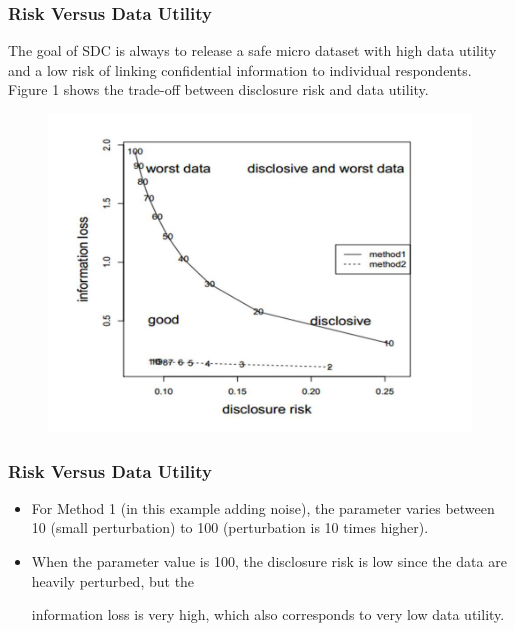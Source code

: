 \documentclass{beamer}
\begin{document}
\begin{frame}
	\frametitle{Risk Versus Data Utility}
The goal of SDC is always to release a safe micro dataset with high data utility and
a low risk of linking conﬁdential information to individual respondents. Figure 1
shows the trade-off between disclosure risk and data utility. 

\end{frame}

\begin{frame}
\begin{figure}
\centering
\includegraphics[width=0.99\linewidth]{JPEGS/TemplGraph1}
\end{figure}

\end{frame}
\begin{frame}
		\frametitle{Risk Versus Data Utility}
\begin{itemize}
\item For Method 1 (in this example adding noise), the parameter varies between 10
(small perturbation) to 100 (perturbation is 10 times higher). 
\item When the parameter
value is 100, the disclosure risk is low since the data are heavily perturbed, but the

information loss is very high, which also corresponds to very low data utility. 
\end{itemize}

\end{frame}
\end{document}
